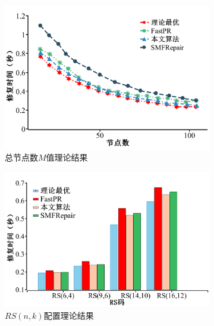 \begin{figure}[htbp]
	\centering
	\begin{subfigure}[t]{0.4\textwidth}
		\centering
		\includegraphics[width=1.0\linewidth]{figures/3-8.pdf}
		\caption{总节点数$M$值理论结果}
		\label{fig:3-8}
	\end{subfigure}
	\begin{subfigure}[t]{0.4\textwidth}
		\centering
		\includegraphics[width=1.1\linewidth]{figures/3-9.pdf}
		\caption{$RS(n,k)$配置理论结果}
		\label{fig:3-9}
	\end{subfigure}
	\begin{subfigure}[t]{0.4\textwidth}
		\centering

\end{subfigure}
\end{figure}
